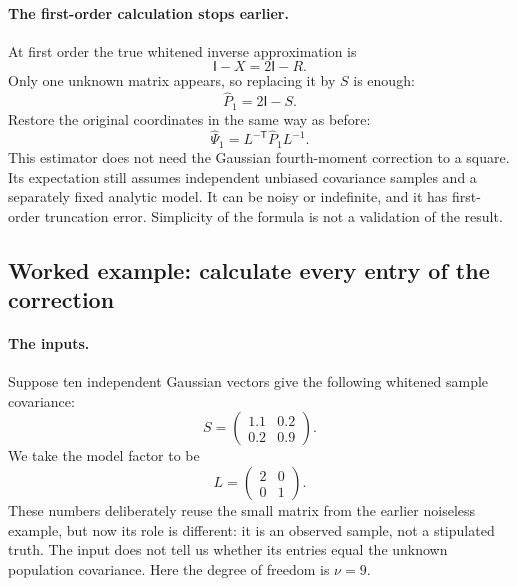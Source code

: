 \documentclass[11pt]{article}
\newcommand{\I}{\mathsf{I}}
\begin{document}
\paragraph{The first-order calculation stops earlier.}
At first order the true whitened inverse approximation is
\begin{equation}
 \I-X=2\I-R.
\end{equation}
Only one unknown matrix appears, so replacing it by $S$ is enough:
\begin{equation}
 \widehat P_1=2\I-S.
\end{equation}
Restore the original coordinates in the same way as before:
\begin{equation}
 \widehat\Psi_1=L^{-\mathsf T}\widehat P_1L^{-1}.
\end{equation}
This estimator does not need the Gaussian fourth-moment correction to a
square. Its expectation still assumes independent unbiased covariance
samples and a separately fixed analytic model. It can be noisy or
indefinite, and it has first-order truncation error. Simplicity of the
formula is not a validation of the result.

\subsection{Worked example: calculate every entry of the correction}
\label{sec:Q-numerical}
\paragraph{The inputs.}
Suppose ten independent Gaussian vectors give the following whitened
sample covariance:
\begin{equation}
 S=\begin{pmatrix}1.1&0.2\\0.2&0.9\end{pmatrix}.
\end{equation}
We take the model factor to be
\begin{equation}
 L=\begin{pmatrix}2&0\\0&1\end{pmatrix}.
\end{equation}
These numbers deliberately reuse the small matrix from the earlier
noiseless example, but now its role is different: it is an observed
sample, not a stipulated truth. The input does not tell us whether its
entries equal the unknown population covariance. Here the degree of
freedom is $\nu=9$.
\end{document}

